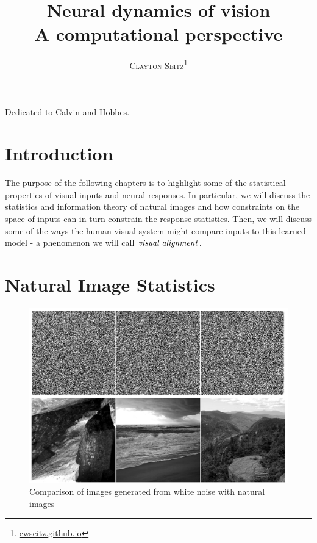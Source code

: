 \documentclass[a4paper,11pt]{book}
\title{\Huge \textbf{Neural dynamics of vision}  \\ \huge A computational perspective}
\author{\textsc{Clayton Seitz}\thanks{\url{cwseitz.github.io}}}
\newenvironment{dedication}
{
   \cleardoublepage
   \thispagestyle{empty}
   \vspace*{\stretch{1}}
   \hfill\begin{minipage}[t]{0.66\textwidth}
   \raggedright
}
{
   \end{minipage}
   \vspace*{\stretch{3}}
   \clearpage
}
\begin{document}
\frontmatter
\maketitle

\begin{dedication}
Dedicated to Calvin and Hobbes.
\end{dedication}

\tableofcontents
\mainmatter

\chapter{Introduction}

The purpose of the following chapters is to highlight some of the statistical properties of visual inputs and neural responses. In particular, we will discuss the statistics and information theory of natural images and how constraints on the space of inputs can in turn constrain the response statistics. Then, we will discuss some of the ways the human visual system might compare inputs to this learned model - a phenomenon we will call $\it{visual \; alignment}$.



\chapter{Natural Image Statistics}

\begin{figure}
  \includegraphics[width=\linewidth]{assets/natural-images.png}
  \caption{Comparison of images generated from white noise with natural images}
\end{figure}
\end{document}
